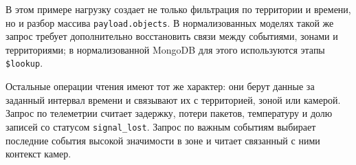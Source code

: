 В этом примере нагрузку создает не только фильтрация по территории и времени,
но и разбор массива \texttt{payload.objects}. В нормализованных моделях такой
же запрос требует дополнительно восстановить связи между событиями, зонами и
территориями; в нормализованной MongoDB для этого используются этапы
\texttt{\$lookup}.

Остальные операции чтения имеют тот же характер: они берут данные за заданный
интервал времени и связывают их с территорией, зоной или камерой. Запрос по
телеметрии считает задержку, потери пакетов, температуру и долю записей со
статусом \texttt{signal\_lost}. Запрос по важным событиям выбирает последние
события высокой значимости в зоне и читает связанный с ними контекст камер.
